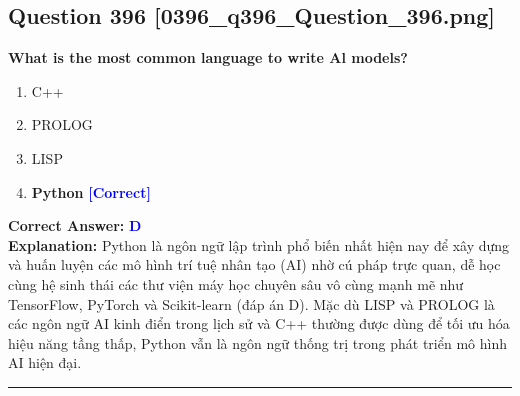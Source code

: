\documentclass[11pt,a4paper]{article}
\begin{document}
\begin{minipage}{\textwidth}
\subsection*{Question 396 \quad \footnotesize{[0396\_q396\_Question\_396.png]}}
\noindent \textbf{What is the most common language to write Al models?}

\begin{enumerate}[label=\Alph*.]
    \item C++
    \item PROLOG
    \item LISP
    \item \textbf{Python} \hfill \textcolor{blue}{\textbf{[Correct]}}
\end{enumerate}

\noindent \textbf{Correct Answer:} \textcolor{blue}{\textbf{D}} \\[2pt]
\noindent \textbf{Explanation:} Python là ngôn ngữ lập trình phổ biến nhất hiện nay để xây dựng và huấn luyện các mô hình trí tuệ nhân tạo (AI) nhờ cú pháp trực quan, dễ học cùng hệ sinh thái các thư viện máy học chuyên sâu vô cùng mạnh mẽ như TensorFlow, PyTorch và Scikit-learn (đáp án D). Mặc dù LISP và PROLOG là các ngôn ngữ AI kinh điển trong lịch sử và C++ thường được dùng để tối ưu hóa hiệu năng tầng thấp, Python vẫn là ngôn ngữ thống trị trong phát triển mô hình AI hiện đại.

\par\vspace{0.3cm}
\hrule
\vspace{0.3cm}
\end{minipage}
\end{document}
